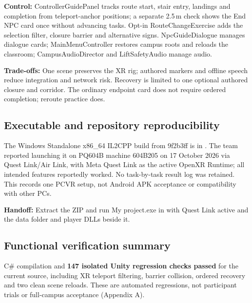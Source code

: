 \documentclass[12pt,a4paper]{article}
\newcommand{\code}[1]{\textnormal{#1}}
\begin{document}
\textbf{Control:} ControllerGuidePanel tracks route start, stair entry,
landings and completion from teleport-anchor positions; a separate 2.5\,m
check shows the End NPC card once without advancing tasks. Opt-in
RouteChangeExercise adds the selection filter, closure barrier and alternative
signs. NpcGuideDialogue manages dialogue cards; MainMenuController restores
campus roots and reloads the classroom; CampusAudioDirector and LiftSafetyAudio
manage audio.

\textbf{Trade-offs:} One scene preserves the XR rig; authored markers and
offline speech reduce integration and network risk. Recovery is limited to
one optional authored closure and corridor. The ordinary endpoint card does
not require ordered completion; reroute practice does.

\subsection{Executable and repository reproducibility}
The Windows Standalone x86\_64 IL2CPP build from \code{9f2b3ff} is in
. The team reported launching it on PQ604B
machine 604B205 on 17 October 2026 via Quest Link/Air Link, with Meta Quest
Link as the active OpenXR Runtime; all intended features reportedly worked.
No task-by-task result log was retained. This records one PCVR setup, not
Android APK acceptance or compatibility with other PCs.

\textbf{Handoff:} Extract the ZIP and run \code{My project.exe} in
 with Quest Link active and the data folder and player
DLLs beside it.

\subsection{Functional verification summary}
C\# compilation and \textbf{147 isolated Unity regression checks passed} for
the current source, including XR teleport filtering, barrier collision,
ordered recovery and two clean scene reloads. These are automated regressions,
not participant trials or full-campus acceptance (Appendix A).
\end{document}
